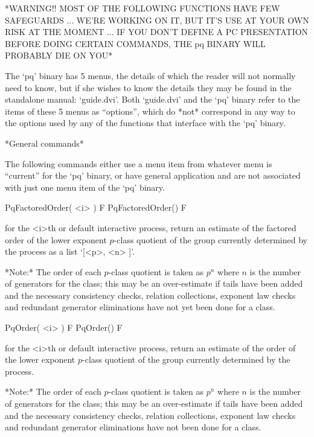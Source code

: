 
*WARNING!! MOST OF THE FOLLOWING FUNCTIONS HAVE FEW SAFEGUARDS ... WE'RE
 WORKING ON IT, BUT IT'S USE AT YOUR OWN RISK AT THE MOMENT ... IF YOU
 DON'T DEFINE A PC PRESENTATION BEFORE DOING CERTAIN COMMANDS, THE pq
 BINARY WILL PROBABLY DIE ON YOU*

The `pq' binary has 5 menus, the details of which  the  reader  will  not
normally need to know, but if she wishes to know the details they may  be
found in the standalone manual: `guide.dvi'.  Both  `guide.dvi'  and  the
`pq' binary refer to the items of these 5 menus as ``options'', which  do
*not* correspond in any way to the options used  by  any  of  the  {\GAP}
functions that interface with the `pq' binary.

*General commands*

The following commands either use a  menu  item  from  whatever  menu  is
``current'' for the `pq' binary, or have general application and are  not
associated with just one menu item of the `pq' binary.

\>PqFactoredOrder( <i> ) F
\>PqFactoredOrder() F

for the <i>th or default interactive {\ANUPQ} process, return an estimate
of the factored order of the lower exponent  $p$-class  quotient  of  the
group currently determined by the process as a list `[<p>, <n> ]'.

*Note:* The order of each $p$-class quotient is taken as $p^n$ where  $n$
is the number of generators for the class; this may be  an  over-estimate
if tails have been added and the necessary consistency  checks,  relation
collections, exponent law checks  and  redundant  generator  eliminations
have not yet been done for a class.

\>PqOrder( <i> ) F
\>PqOrder() F

for the <i>th or default interactive {\ANUPQ} process, return an estimate
of the order of the  lower  exponent  $p$-class  quotient  of  the  group
currently determined by the process.

*Note:* The order of each $p$-class quotient is taken as $p^n$ where  $n$
is the number of generators for the class; this may be  an  over-estimate
if tails have been added and the necessary consistency  checks,  relation
collections, exponent law checks  and  redundant  generator  eliminations
have not been done for a class.

